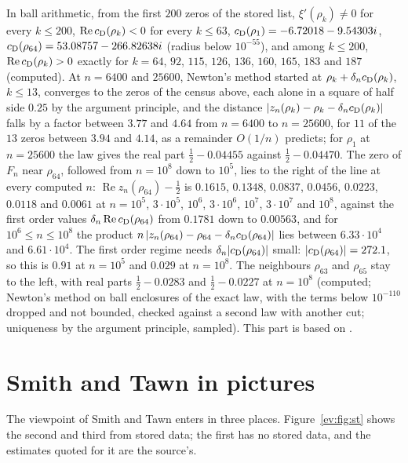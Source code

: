 \begin{resultpar}\label{ev:res:lbias}In ball arithmetic, from the first $200$ zeros of the stored list, $\xi'(\rho_k)\ne0$ for every $k\le200$, $\operatorname{Re}c_{\rm D}(\rho_k)<0$ for every $k\le63$, $c_{\rm D}(\rho_1)=-6.72018-9.54303i$, $c_{\rm D}(\rho_{64})=53.08757-266.82638i$ (radius below $10^{-55}$), and among $k\le200$, $\operatorname{Re}c_{\rm D}(\rho_k)>0$ exactly for $k=64$, $92$, $115$, $126$, $136$, $160$, $165$, $183$ and $187$ (computed). At $n=6400$ and $25600$, Newton's method started at $\rho_k+\delta_nc_{\rm D}(\rho_k)$, $k\le13$, converges to the zeros of the census above, each alone in a square of half side $0.25$ by the argument principle, and the distance $|z_n(\rho_k)-\rho_k-\delta_nc_{\rm D}(\rho_k)|$ falls by a factor between $3.77$ and $4.64$ from $n=6400$ to $n=25600$, for $11$ of the $13$ zeros between $3.94$ and $4.14$, as a remainder $O(1/n)$ predicts; for $\rho_1$ at $n=25600$ the law gives the real part $\frac12-0.04455$ against $\frac12-0.04470$. The zero of $F_n$ near $\rho_{64}$, followed from $n=10^8$ down to $10^5$, lies to the right of the line at every computed $n$: $\operatorname{Re}z_n(\rho_{64})-\frac12$ is $0.1615$, $0.1348$, $0.0837$, $0.0456$, $0.0223$, $0.0118$ and $0.0061$ at $n=10^5$, $3\cdot10^5$, $10^6$, $3\cdot10^6$, $10^7$, $3\cdot10^7$ and $10^8$, against the first order values $\delta_n\operatorname{Re}c_{\rm D}(\rho_{64})$ from $0.1781$ down to $0.00563$, and for $10^6\le n\le10^8$ the product $n\,|z_n(\rho_{64})-\rho_{64}-\delta_nc_{\rm D}(\rho_{64})|$ lies between $6.33\cdot10^4$ and $6.61\cdot10^4$. The first order regime needs $\delta_n|c_{\rm D}(\rho_{64})|$ small: $|c_{\rm D}(\rho_{64})|=272.1$, so this is $0.91$ at $n=10^5$ and $0.029$ at $n=10^8$. The neighbours $\rho_{63}$ and $\rho_{65}$ stay to the left, with real parts $\frac12-0.0283$ and $\frac12-0.0227$ at $n=10^8$ (computed; Newton's method on ball enclosures of the exact law, with the terms below $10^{-110}$ dropped and not bounded, checked against a second law with another cut; uniqueness by the argument principle, sampled). This part is based on \cite{P26lbias}.\end{resultpar}

\section{Smith and Tawn in pictures}\label{ev:sec:stpic}

The viewpoint of Smith and Tawn enters in three places. Figure~\ref{ev:fig:st} shows the second and third from stored data; the first has no stored data, and the estimates quoted for it are the source's.

